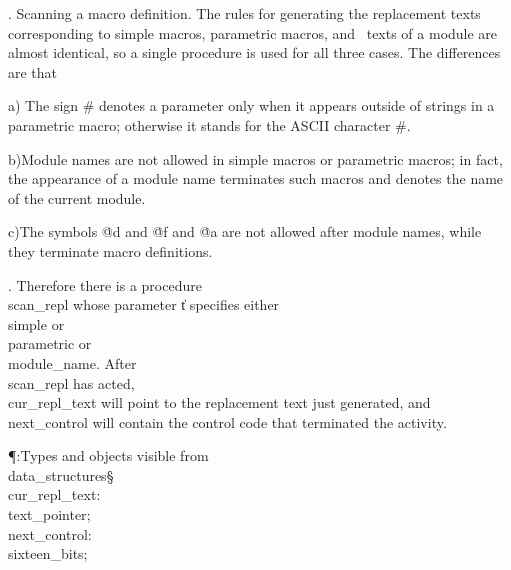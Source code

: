 .  Scanning a macro definition.
The rules for generating the replacement texts corresponding to simple
macros, parametric macros, and \ADA\ texts of a module are almost
identical, so a single procedure is used for all three cases. The
differences are that

\yskip\item{a)} The sign \# denotes a parameter only when it appears
outside of strings in a parametric macro; otherwise it stands for the
ASCII character \#.

\item{b)}Module names are not allowed in simple macros or parametric macros;
in fact, the appearance of a module name terminates such macros and denotes
the name of the current module.

\item{c)}The symbols \.{@d} and \.{@f} and \.{@a} are not allowed after
module names, while they terminate macro definitions.

\fi

. Therefore there is a procedure \\{scan\_repl} whose parameter \|t
specifies
either \\{simple} or \\{parametric} or \\{module\_name}. After \\{scan\_repl}
has
acted, \\{cur\_repl\_text} will point to the replacement text just generated,
and
\\{next\_control} will contain the control code that terminated the activity.

\Y\P\?\4:Types and objects visible from \\{data\_structures}\X\mathrel{+}\S%
\?\6
\\{cur\_repl\_text}\?:\?\\{text\_pointer};\6
\\{next\_control}\?:\?\\{sixteen\_bits};\par
\fi

